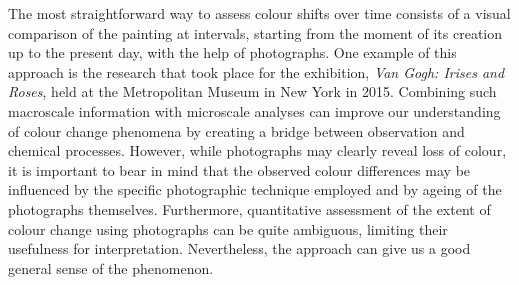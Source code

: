 The most straightforward way to assess colour shifts over time consists of a visual comparison of the painting at intervals, starting from the moment of its creation up to the present day, with the help of photographs. One example of this approach is the research that took place for the exhibition, \textit{Van Gogh: Irises and Roses}, held at the Metropolitan Museum in New York in 2015. Combining such macroscale information with microscale analyses can improve our understanding of colour change phenomena by creating a bridge between observation and chemical processes. However, while photographs may clearly reveal loss of colour, it is important to bear in mind that the observed colour differences may be influenced by the specific photographic technique employed and by ageing of the photographs themselves. Furthermore, quantitative assessment of the extent of colour change using photographs can be quite ambiguous, limiting their usefulness for interpretation. Nevertheless, the approach can give us a good general sense of the phenomenon.\\


